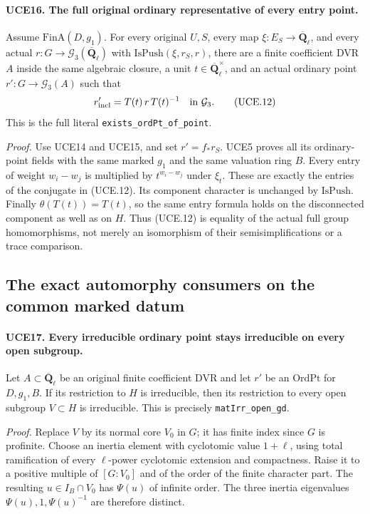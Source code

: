 \documentclass[11pt,a4paper]{article}
\numberwithin{equation}{section}
\theoremstyle{remark}\newtheorem{remark}[theorem]{Remark}
\begin{document}
\paragraph{UCE16. The full original ordinary representative of every entry point.}
\label{claim:UCE16}
Assume \(\mathrm{FinA}(D,g_1)\).  For every original \(U,S\),
every map \(\xi:E_S\to\overline{\mathbf Q}_\ell\), and every
actual \(r:G\to\mathcal G_3(\overline{\mathbf Q}_\ell)\)
with \(\mathrm{IsPush}(\xi,r_S,r)\), there are a finite
coefficient DVR \(A\) inside the same algebraic closure, a unit
\(t\in\overline{\mathbf Q}_\ell^\times\), and an actual
ordinary point \(r':G\to\mathcal G_3(A)\) such that
\[
                    r'_\mathrm{incl}=T(t)\,r\,T(t)^{-1}
                        \quad\hbox{in }\mathcal G_3.
 \tag{UCE.12}
\]
This is the full literal \texttt{exists\_\allowbreak ord\allowbreak Pt\_\allowbreak of\_\allowbreak point}.

\emph{Proof.}
Use UCE14 and UCE15, and set \(r'=f_*r_S\).  UCE5 proves
all its ordinary-point fields with the same marked \(g_1\)
and the same valuation ring \(B\).  Every entry of weight
\(w_i-w_j\) is multiplied by \(t^{w_i-w_j}\) under
\(\xi_t\).  These are exactly the entries of the conjugate
in (UCE.12).  Its component character is unchanged by
\(\mathrm{IsPush}\).  Finally \(\theta(T(t))=T(t)\), so
the same entry formula holds on the disconnected component as
well as on \(H\).  Thus (UCE.12) is equality of the actual
full group homomorphisms, not merely an isomorphism of their
semisimplifications or a trace comparison.

\subsection{The exact automorphy consumers on the common marked datum}

\paragraph{UCE17. Every irreducible ordinary point stays irreducible on every open subgroup.}
\label{claim:UCE17}
Let \(A\subset\overline{\mathbf Q}_\ell\) be an original finite
coefficient DVR and let \(r'\) be an \(\mathrm{OrdPt}\) for
\(D,g_1,B\).  If its restriction to \(H\) is irreducible,
then its restriction to every open subgroup \(V\subset H\)
is irreducible.  This is precisely \texttt{mat\allowbreak Irr\_\allowbreak open\_\allowbreak gd}.

\emph{Proof.}
Replace \(V\) by its normal core \(V_0\) in \(G\); it
has finite index since \(G\) is profinite.  Choose an inertia
element with cyclotomic value \(1+\ell\), using total ramification
of every \(\ell\)-power cyclotomic extension and compactness.
Raise it to a positive multiple of \([G:V_0]\) and of the
order of the finite character part.  The resulting
\(u\in I_B\cap V_0\) has \(\Psi(u)\) of infinite order.
The three inertia eigenvalues \(\Psi(u),1,\Psi(u)^{-1}\)
are therefore distinct.
\end{document}
